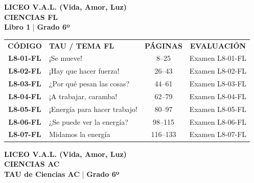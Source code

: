 \documentclass[11pt, letterpaper]{article}
\begin{document}
	\begin{center} 
		{\Large \textbf{\color{valblue} LICEO V.A.L. (Vida, Amor, Luz)}}\\[0.1cm] 
		{\large \textbf{CIENCIAS FL}}\\[0.1cm] 
		{\small \textbf{Libro 1} \quad | \quad \textbf{Grado 6º}} 
	\end{center} 
	\vspace{0.2cm} 
	
	
	
	\begin{center} 
		\small 
		\begin{tabularx}{\textwidth}{cXcc} 
			\textbf{CÓDIGO} & \textbf{TAU / TEMA FL} & \textbf{PÁGINAS} & \textbf{EVALUACIÓN} \\ 
			\textbf{L8-01-FL} & ¡Se mueve!  &  8--25 & Examen L8-01-FL \\ 
			\rowcolor{valgray} \textbf{L8-02-FL} & ¡Hay que hacer fuerza!  &  26--43 & Examen L8-02-FL \\ 
			\textbf{L8-03-FL} & ¿Por qué pesan las cosas?  &  44--61 & Examen L8-03-FL \\ 
			\rowcolor{valgray} \textbf{L8-04-FL} & ¡A trabajar, caramba!  &  62--79 & Examen L8-04-FL \\ 
			\textbf{L8-05-FL} & ¡Energía para hacer trabajo!  &  80--97 & Examen L8-05-FL \\ 
			\rowcolor{valgray} \textbf{L8-06-FL} & ¿Se puede ver la energía?  &  98--115 & Examen L8-06-FL \\ 
			\textbf{L8-07-FL} & Midamos la energía  &  116--133 & Examen L8-07-FL \\ 
		\end{tabularx} 
	\end{center} 
	\newpage 
	
	\begin{center} 
		{\Large \textbf{\color{valblue} LICEO V.A.L. (Vida, Amor, Luz)}}\\[0.1cm] 
		{\large \textbf{CIENCIAS AC}}\\[0.1cm] 
		{\small \textbf{TAU de Ciencias AC} \quad | \quad \textbf{Grado 6º}} 
	\end{center} 
	\vspace{0.2cm} 
	
\end{document}
